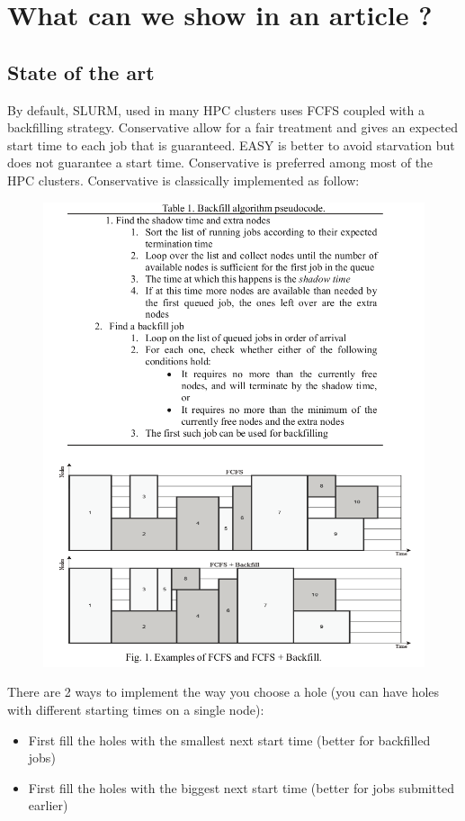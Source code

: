 \documentclass[a4paper]{article}
\begin{document}
\section{What can we show in an article ?}

\subsection{State of the art}

By default, SLURM, used in many HPC clusters uses FCFS coupled with 
a backfilling strategy. Conservative allow for a fair treatment and 
gives an expected start time to each job that is guaranteed.
EASY is better to avoid starvation but does not guarantee a start time.
Conservative is preferred among most of the HPC clusters.
Conservative is classically implemented as follow:\\
\begin{figure}[H]\centering\includegraphics[scale = 0.5]{Images/conservative_backfill.png}\end{figure}

There are 2 ways to implement the way you choose a hole (you can have
holes with different starting times on a single node):
\begin{itemize}
	\item First fill the holes with the smallest next start time (better for backfilled jobs)
	\item First fill the holes with the biggest next start time (better for jobs submitted earlier)
\end{itemize}
\end{document}
